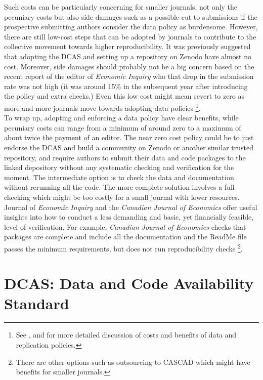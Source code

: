 \documentclass[11pt]{article}
\begin{document}
Such costs can be particularly concerning for smaller journals, not only the pecuniary costs but also side damages such as a possible cut to submissions if the prospective submitting authors consider the data policy as burdensome. However, there are still low-cost steps that can be adopted by journals to contribute to the collective movement towards higher reproducibility. It was previously suggested that adopting the DCAS and setting up a repository on Zenodo have almost no cost. Moreover, side damages should probably not be a big concern based on the recent report of the editor of \textit{Economic Inquiry} who that drop in the submission rate was not high (it was around 15\% in the subsequent year after introducing the policy and extra checks.) Even this low cost might mean revert to zero as more and more journals move towards adopting data policies \footnote{See \cite{whited2023Costs}, \cite{chang2015economics} and \cite{anderson2008role} for more detailed discussion of costs and benefits of data and replication policies.}. \\


To wrap up, adopting and enforcing a data policy have clear benefits, while pecuniary costs can range from a minimum of around zero to a maximum of about twice the payment of an editor. The near zero cost policy could be to just endorse the DCAS and build a community on Zenodo or another similar trusted repository, and require authors to submit their data and code packages to the linked depository without any systematic checking and verification for the moment. The intermediate option is to check the data and documentation without rerunning all the code. The more complete solution involves a full checking which might be too costly for a small journal with lower resources. Journal of \textit{Economic Inquiry} and the \textit{Canadian Journal of Economics} offer useful insights into how to conduct a less demanding and basic, yet financially feasible, level of verification. For example, \textit{Canadian Journal of Economics} checks that packages are complete and include all the documentation and the ReadMe file passes the minimum requirements, but does not run reproducibility checks \footnote{There are other options such as outsourcing to CASCAD which might have benefits for smaller journals.}.




\newpage
\appendix
\section{DCAS: Data and Code Availability Standard}
\end{document}
